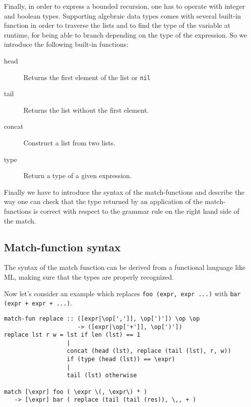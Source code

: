 Finally, in order to express a bounded recursion, one has to operate
with integer and boolean types. Supporting algebraic data types comes
with several built-in function in order to traverse the lists and to
find the type of the variable at runtime, for being able to branch
depending on the type of the expression.  So we introduce the following
built-in functions: 
\begin{description}
    \item[head]     Returns the first element of the list or \verb|nil|
    \item[tail]     Returns the list without the first element.
    \item[concat]   Construct a list from two lists.
    \item[type]     Return a type of a given expression.
\end{description}

Finally we have to introduce the syntax of the match-functions and
describe the way one can check that the type returned by an application
of the match-functions is correct with respect to the grammar rule
on the right hand side of the match.

\subsection{Match-function syntax}
The syntax of the match function can be derived from a functional
language like ML, making sure that the types are properly recognized.


Now let's consider an example which replaces \verb|foo (expr, expr ...)|
with \verb|bar (expr + expr + ...)|.

\begin{verbatim}
match-fun replace :: ([expr|\op[',']], \op[')']) \op \op 
                     -> ([expr|\op['+']], \op[')'])
replace lst r w = lst if len (lst) == 1
                  |
                  concat (head (lst), replace (tail (lst), r, w))
                  if (type (head (lst)) == \expr)
                  |
                  tail (lst) otherwise

match [\expr] foo ( \expr \(, \expr\) * )
   -> [\expr] bar ( replace (tail (tail (res)), \,, + )
\end{verbatim}
